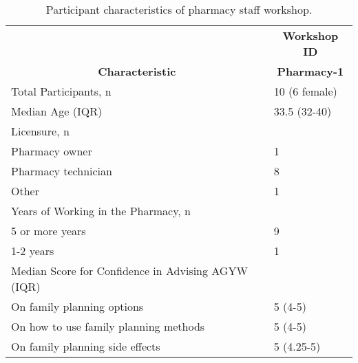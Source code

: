 \begin{table}[h!]
\caption{Participant characteristics of pharmacy staff workshop.}
\label{tab:pharm-participants}
\resizebox{\columnwidth}{!} {
\begin{tabular}{|p{7cm}||p{4cm}|}
\hline
\multicolumn{1}{|c||}{} &
\multicolumn{1}{c|}{\textbf{Workshop ID}} \\
\multicolumn{1}{|c||}{\textbf{Characteristic}} & \multicolumn{1}{c|}{\textbf{Pharmacy-1}} \\
\hline
Total Participants, n& 10 (6 female) \\
\hline
Median Age (IQR) & 33.5 (32-40) \\
\hline
Licensure, n & \\
\hspace{3mm} Pharmacy owner & 1\\
\hspace{3mm} Pharmacy technician & 8\\
\hspace{3mm} Other & 1\\
\hline
Years of Working in the Pharmacy, n &   \\ 
\hspace{3mm}5 or more years & 9 \\ 
\hspace{3mm}1-2 years & 1 \\
\hline
Median Score for Confidence in Advising AGYW (IQR) &   \\ 
\hspace{3mm}On family planning options & 5 (4-5) \\ 
\hspace{3mm}On how to use family planning methods & 5 (4-5) \\
\hspace{3mm}On family planning side effects & 5 (4.25-5) \\
\hline
\end{tabular}
}
\end{table}


